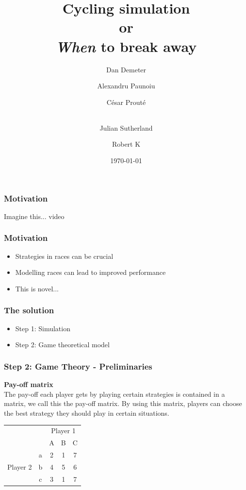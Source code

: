 \documentclass{beamer}
\title[Cycling simulation]{Cycling simulation \\or\\ \textit{When} to break away}
\author[]{%
  Dan Demeter\inst{1} \and
  Alexandru Paunoiu\inst{1} \and
  C\'esar Prout\'e \inst{1} \and \\
  Julian Sutherland \inst{1} \and
  Robert K\inst{1}
  }
\institute[Imperial College London]{  
  \inst{1}%
  Imperial College London \\
  Department of Computing \\
  
 }
\date{\today}
\begin{document}
%
\begin{frame}
\titlepage
\end{frame}
%
\large
\begin{frame}
\frametitle{Motivation}
\begin{block}
{Imagine this...}
video
\end{block}
\end{frame}

\begin{frame}
\frametitle{Motivation}

\begin{itemize}
	\item Strategies in races can be crucial
	\item Modelling races can lead to improved performance
	\item This is novel...
\end{itemize}

\end{frame}

\begin{frame}
\frametitle{The solution}

\begin{itemize}
	\item Step 1: Simulation
	\item Step 2: Game theoretical model
\end{itemize}

\end{frame}


\begin{frame}
\frametitle{Step 2: Game Theory - Preliminaries}

\textbf{Pay-off matrix}\\
The pay-off each player gets by playing certain strategies is contained in a matrix, we call this the pay-off matrix. By using this matrix, players can choose the best strategy they should play in certain situations.

\begin{example}
\begin{table}[ht!]
	\hspace{-4em}
	\centering
	\begin{tabular}{ccccc|}
		& & \multicolumn{3}{c}{Player 1}                                \\ \cline{3-5}
		& & A & B & \multicolumn{1}{c}{C}                               \\ \cline{3-5}
		\multirow{3}{*}{Player 2} & \multicolumn{1}{|c|}{a} & 2 & 1 & 7 \\
		& \multicolumn{1}{|c|}{b} & 4 & 5 & 6                           \\
		& \multicolumn{1}{|c|}{c} & 3 & 1 & 7                           \\ \cline{3-5}
	\end{tabular}
\end{table}
\end{example}

\end{frame}
\end{document}
